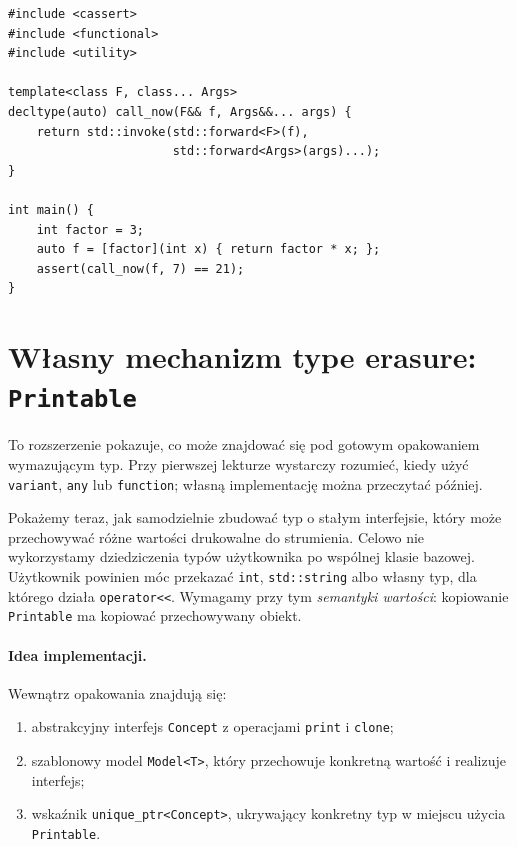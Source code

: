 \begin{lstlisting}[caption={Wywołanie generyczne bez type erasure; kompletny program.}]
#include <cassert>
#include <functional>
#include <utility>

template<class F, class... Args>
decltype(auto) call_now(F&& f, Args&&... args) {
    return std::invoke(std::forward<F>(f),
                       std::forward<Args>(args)...);
}

int main() {
    int factor = 3;
    auto f = [factor](int x) { return factor * x; };
    assert(call_now(f, 7) == 21);
}
\end{lstlisting}

\section{Własny mechanizm type erasure: \texttt{Printable}}
\label{sec:cpp14-custom-erasure}

To rozszerzenie pokazuje, co może znajdować się pod gotowym
opakowaniem wymazującym typ. Przy pierwszej lekturze wystarczy
rozumieć, kiedy użyć \texttt{variant}, \texttt{any} lub
\texttt{function}; własną implementację można przeczytać później.

Pokażemy teraz, jak samodzielnie zbudować typ o stałym interfejsie,
który może przechowywać różne wartości drukowalne do strumienia. Celowo
nie wykorzystamy dziedziczenia typów użytkownika po wspólnej klasie
bazowej. Użytkownik powinien móc przekazać \texttt{int},
\texttt{std::string} albo własny typ, dla którego działa
\texttt{operator<<}. Wymagamy przy tym \emph{semantyki wartości}:
kopiowanie \texttt{Printable} ma kopiować przechowywany obiekt.

\paragraph{Idea implementacji.}
Wewnątrz opakowania znajdują się:
\begin{enumerate}
\item abstrakcyjny interfejs \texttt{Concept} z operacjami \texttt{print}
      i \texttt{clone};
\item szablonowy model \texttt{Model<T>}, który przechowuje konkretną
      wartość i realizuje interfejs;
\item wskaźnik \texttt{unique\_ptr<Concept>}, ukrywający konkretny
      typ w miejscu użycia \texttt{Printable}.
\end{enumerate}

